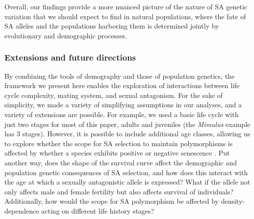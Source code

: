 \documentclass[11pt,draft]{article}
\begin{document}
Overall, our findings provide a more nuanced picture of the nature of SA genetic variation that we should expect to find in natural populations, where the fate of SA alleles and the populations harboring them is determined jointly by evolutionary and demographic processes.


\subsubsection*{Extensions and future directions}

By combining the tools of demography and those of population genetics, the framework we present here enables the exploration of interactions between life cycle complexity, mating system, and sexual antagonism. For the sake of simplicity, we made a variety of simplifying assumptions in our analyses, and a variety of extensions are possible. For example, we used a basic life cycle with just two stages for most of this paper, adults and juveniles (the \textit{Mimulus} example has $3$ stages). However, it is possible to include additional age classes, allowing us to explore whether the scope for SA selection to maintain polymorphisms is affected by whether a species exhibits positive or negative senescence \citep{jones2014diversity}. Put another way, does the shape of the survival curve affect the demographic and population genetic consequences of SA selection, and how does this interact with the age at which a sexually antagonistic allele is expressed? What if the allele not only affects male and female fertility but also affects survival of individuals? Additionally, how would the scope for SA polymorphism be affected by density-dependence acting on different life history stages?
\end{document}
